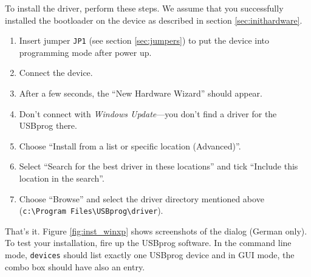 \documentclass[bibtotoc,UKenglish,halfparskip,oneside,DIV12]{scrreprt}
\begin{document}
To install the driver, perform these steps. We assume that you successfully installed the bootloader
on the device as described in section \vref{sec:inithardware}.

\begin{enumerate}
  \item Insert jumper \texttt{JP1} (see section \vref{sec:jumpers}) to put the device into
    programming mode after power up.
  \item Connect the device.
  \item After a few seconds, the ``New Hardware Wizard'' should appear.
  \item Don't connect with \emph{Windows Update}---you don't find a driver for the USBprog there.
  \item Choose ``Install from a list or specific location (Advanced)''.
  \item Select ``Search for the best driver in these locations'' and tick ``Include this location in
    the search''.
  \item Choose ``Browse'' and select the driver directory mentioned above \newline
    (\texttt{c:\textbackslash{}Program Files\textbackslash{}USBprog\textbackslash{}driver}).
\end{enumerate}

That's it. Figure \vref{fig:inst_winxp} shows screenshots of the dialog (German only). To test your
installation, fire up the USBprog software. In the command line mode, \texttt{devices} should list
exactly one USBprog device and in GUI mode, the combo box should have also an entry.
\end{document}
